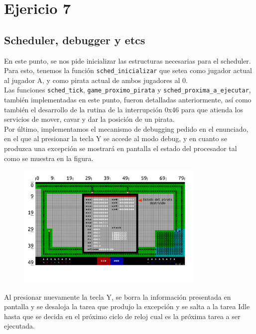 \section{Ejericio 7}

\subsection{Scheduler, debugger y etcs}

En este punto, se nos pide inicializar las estructuras necesarias para el scheduler. Para esto, tenemos la función \texttt{sched\_inicializar} que setea como jugador actual al jugador A, y como pirata actual de ambos jugadores al 0.\\

Las funciones \texttt{sched\_tick}, \texttt{game\_proximo\_pirata} y \texttt{sched\_proxima\_a\_ejecutar}, también implementadas en este punto, fueron detalladas anteriormente, así como también el desarrollo de la rutina de la interrupción 0x46 para que atienda los servicios de mover, cavar y dar la posición de un pirata.\\

Por último, implementamos el mecanismo de debugging pedido en el enunciado, en el que al presionar la tecla Y se accede al modo debug, y en cuanto se produzca una excepción se mostrará en pantalla el estado del procesador tal como se muestra en la figura.\\

\begin{figure}[ht]
\centering
\includegraphics[width=90mm]{ej_7/img_ej_7.png}
\end{figure}

Al presionar nuevamente la tecla Y, se borra la información presentada en pantalla y se desaloja la tarea que produjo la excepción y se salta a la tarea Idle hasta que se decida en el próximo ciclo de reloj cual es la próxima tarea a ser ejecutada.\\

